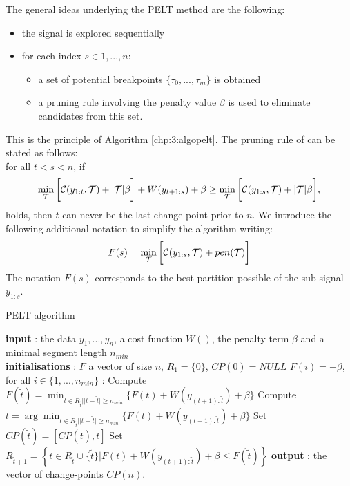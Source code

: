 The general ideas underlying the PELT method are the following:
\begin{itemize}
\item the signal is explored sequentially 
\item for each index $s \in {1,...,n}$:
\begin{itemize}
\item a set of potential breakpoints $\{\tau_0,...,\tau_m\}$ is obtained
\item a pruning rule involving the penalty value $\beta$ is used to eliminate candidates from this set.
\end{itemize}
\end{itemize}

This is the principle of Algorithm \ref{chp:3:algopelt}. The pruning rule of \cite{Killick2012} can be stated as follows: \\
 for all $t <s < n$, if
\begin{equation}\label{chp:3:pruning}
 \min_{{\mathcal T}}\bigg[{\mathcal C}(y_{1:t},{\mathcal T})+\lvert{\mathcal T}\rvert\beta\bigg] + W(y_{t+1:s}) +\beta \geq \min_{{\mathcal T}}\bigg[{\mathcal C}(y_{1:s},{\mathcal T})+\lvert{\mathcal T}\rvert\beta\bigg], 
\end{equation}
holds, then $t$ can never be the last change point prior to $n$. We introduce the following additional notation to simplify the algorithm writing:  
$$F(s) = \min_{{\mathcal T}}\bigg[{\mathcal C}(y_{1:s},{\mathcal T})+pen({\mathcal T})\bigg]$$
The notation $F(s)$ corresponds to the best partition possible of the sub-signal $y_{1:s}$. 
\begin{algorithm}[ht]
\caption{PELT algorithm}\label{chp:3:algopelt}
\begin{algorithmic}
\State \textbf{input} : the data $y_{1},...,y_{n}$, a cost function $W()$, the penalty term $\beta$ and a minimal segment length $n_{min}$ \\
  \State \textbf{initialisations} : $F$ a vector of size $n$, $R_{1}=\lbrace 0\rbrace$, $CP(0)=NULL$  
  \State $F(i) = -\beta$, for all $i \in \{1,...,n_{min}\}$
   :
  \State Compute 
  $ F(\tilde t)=\min_{t\in R_{\tilde t}\vert \lvert t-\tilde{t}\rvert \geq n_{min}}\lbrace F(t)+W(y_{(t+1):\tilde t})+\beta\rbrace $
  \State Compute $ \overline t=\arg \min_{t\in R_{\tilde t}\vert \lvert t-\tilde{t}\rvert \geq n_{min}}\lbrace F(t)+W(y_{(t+1):\tilde t})+\beta\rbrace $ 
  \State Set $CP(\tilde t)=[CP(\overline t), \overline t]$
  \State Set $R_{\tilde t+1}=\left\{t\in R_{\tilde t}\cup \lbrace\tilde t\rbrace \vert F(t)+W(y_{(t+1):\tilde t}) +\beta \le F(\tilde t)   \right\}$ 
\EndFor 
\State \textbf{output} : the vector of change-points $CP(n)$. 
\end{algorithmic}
\end{algorithm} 

